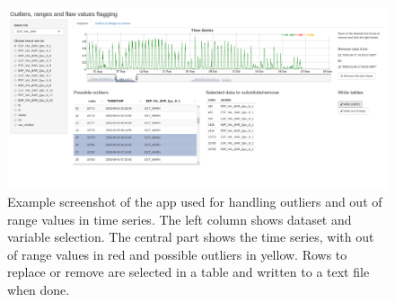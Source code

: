 \documentclass[11pt,twoside]{reedthesis}
\begin{document}
\setlength{\abovecaptionskip}{15pt}
\begin{figure}

{\centering \includegraphics[width=1\linewidth]{figure/appendixB/outapp} 

}

\caption[Example screenshot of the app used for handling outliers and out of range values in time series.]{Example screenshot of the app used for handling outliers and out of range values in time series. The left column shows dataset and variable selection. The central part shows the time series, with out of range values in red and possible outliers in yellow. Rows to replace or remove are selected in a table and written to a text file when done.}\label{fig:unnamed-chunk-7}
\end{figure}
\setlength{\abovecaptionskip}{0pt} \newpage
\end{document}
